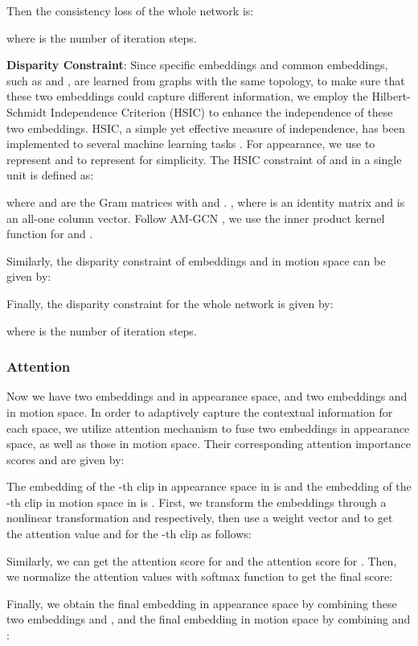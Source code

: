 \documentclass[journal]{IEEEtran}
\begin{document}
Then the consistency loss of the whole network is:

where  is the number of iteration steps.

\textbf{Disparity Constraint}:
Since specific embeddings and common embeddings, such as  and , are learned from graphs with the same topology, to make sure that these two embeddings could capture different information, we employ the Hilbert-Schmidt Independence Criterion (HSIC) \cite{song2007supervised} to enhance the independence of these two embeddings. HSIC, a simple yet effective measure of independence, has been implemented to several machine learning tasks \cite{gretton2005measuring}. For appearance, we use  to represent  and  to represent  for simplicity. The HSIC constraint of  and  in a single unit is defined as:

where  and  are the Gram matrices with  and . , where  is an identity matrix and  is an all-one column vector. Follow AM-GCN \cite{wang2020gcn}, we use the inner product kernel function for  and .

Similarly, the disparity constraint of embeddings  and  in motion space can be given by:


Finally, the disparity constraint for the whole network is given by:

where  is the number of iteration steps.

\subsubsection{Attention} \label{sec:Attn}
Now we have two embeddings  and  in appearance space, and two embeddings  and  in motion space. In order to adaptively capture the contextual information for each space, we utilize attention mechanism to fuse two embeddings in appearance space, as well as those in motion space. Their corresponding attention importance scores  and  are given by:

The embedding of the -th clip in appearance space in  is  and the embedding of the -th clip in motion space in  is . First, we transform the embeddings through a nonlinear transformation  and  respectively, then use a weight vector  and  to get the attention value  and  for the -th clip as follows:

Similarly, we can get the attention score  for  and the attention score  for . Then, we normalize the attention values with softmax function to get the final score:

Finally, we obtain the final embedding  in appearance space by combining these two embeddings  and , and the final embedding  in motion space by combining  and :
 
\end{document}
